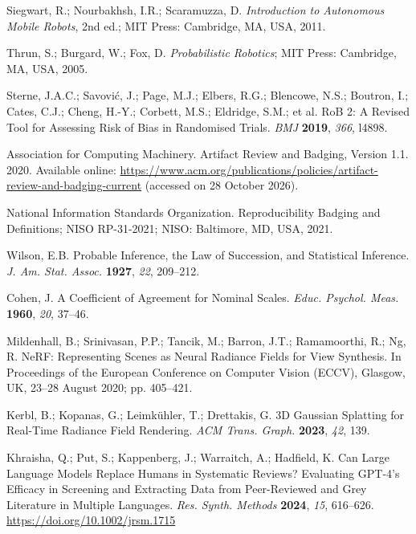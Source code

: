 Siegwart, R.; Nourbakhsh, I.R.; Scaramuzza, D. {\em Introduction to
Autonomous Mobile Robots}, 2nd ed.; MIT Press: Cambridge, MA, USA, 2011.

Thrun, S.; Burgard, W.; Fox, D. {\em Probabilistic Robotics}; MIT Press:
Cambridge, MA, USA, 2005.

Sterne, J.A.C.; Savovi\'{c}, J.; Page, M.J.; Elbers, R.G.; Blencowe, N.S.;
Boutron, I.; Cates, C.J.; Cheng, H.-Y.; Corbett, M.S.; Eldridge, S.M.; et al.
RoB 2: A Revised Tool for Assessing Risk of Bias in Randomised Trials.
{\em BMJ} {\bf 2019}, {\em 366}, l4898.

Association for Computing Machinery. Artifact Review and Badging, Version 1.1.
2020. Available online:
\url{https://www.acm.org/publications/policies/artifact-review-and-badging-current}
(accessed on 28 October 2026).

National Information Standards Organization. Reproducibility Badging and
Definitions; NISO RP-31-2021; NISO: Baltimore, MD, USA, 2021.

Wilson, E.B. Probable Inference, the Law of Succession, and Statistical
Inference. {\em J. Am. Stat. Assoc.} {\bf 1927}, {\em 22}, 209--212.

Cohen, J. A Coefficient of Agreement for Nominal Scales. {\em Educ. Psychol.
Meas.} {\bf 1960}, {\em 20}, 37--46.

Mildenhall, B.; Srinivasan, P.P.; Tancik, M.; Barron, J.T.; Ramamoorthi, R.;
Ng, R. NeRF: Representing Scenes as Neural Radiance Fields for View
Synthesis. In Proceedings of the European Conference on Computer Vision
(ECCV), Glasgow, UK, 23--28 August 2020; pp. 405--421.

Kerbl, B.; Kopanas, G.; Leimk\"{u}hler, T.; Drettakis, G. 3D Gaussian
Splatting for Real-Time Radiance Field Rendering. \emph{ACM Trans. Graph.}
\textbf{2023}, \emph{42}, 139.

Khraisha, Q.; Put, S.; Kappenberg, J.; Warraitch, A.; Hadfield, K. Can Large
Language Models Replace Humans in Systematic Reviews? Evaluating GPT-4's
Efficacy in Screening and Extracting Data from Peer-Reviewed and Grey
Literature in Multiple Languages. {\em Res. Synth. Methods} {\bf 2024},
{\em 15}, 616--626. \url{https://doi.org/10.1002/jrsm.1715}
